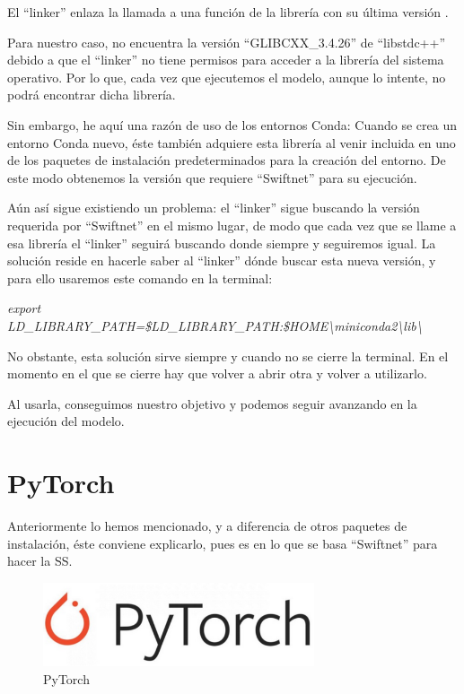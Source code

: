 El ``linker'' enlaza la llamada a una función de la librería con su última versión \cite{glibcxx}.

Para nuestro caso, no encuentra la versión ``GLIBCXX\_3.4.26'' de ``libstdc++'' debido a que el ``linker'' no tiene permisos para acceder a la librería del sistema operativo. Por lo que, cada vez que ejecutemos el modelo, aunque lo intente, no podrá encontrar dicha librería.

Sin embargo, he aquí una razón de uso de los entornos Conda: Cuando se crea un entorno Conda nuevo, éste también adquiere esta librería al venir incluida en uno de los paquetes de instalación predeterminados para la creación del entorno. De este modo obtenemos la versión que requiere ``Swiftnet'' para su ejecución.

Aún así sigue existiendo un problema: el ``linker'' sigue buscando la versión requerida por ``Swiftnet'' en el mismo lugar, de modo que cada vez que se llame a esa librería el ``linker'' seguirá buscando donde siempre y seguiremos igual. La solución reside en hacerle saber al ``linker'' dónde buscar esta nueva versión, y para ello usaremos este comando en la terminal:

\begin{center}
\textit{export LD\_LIBRARY\_PATH=\$LD\_LIBRARY\_PATH:\$HOME\textbackslash{miniconda2}\textbackslash{lib}\textbackslash{}}
\end{center}

No obstante, esta solución sirve siempre y cuando no se cierre la terminal. En el momento en el que se cierre hay que volver a abrir otra y volver a utilizarlo.

Al usarla, conseguimos nuestro objetivo y podemos seguir avanzando en la ejecución del modelo.

\section{PyTorch}

Anteriormente lo hemos mencionado, y a diferencia de otros paquetes de instalación, éste conviene explicarlo, pues es en lo que se basa ``Swiftnet'' para hacer la \ac{SS}.

\begin{figure}[H]
  \centering
  \includegraphics[width=8cm]{Figuras/PyTorch.eps}
  \caption{PyTorch}
\end{figure}

